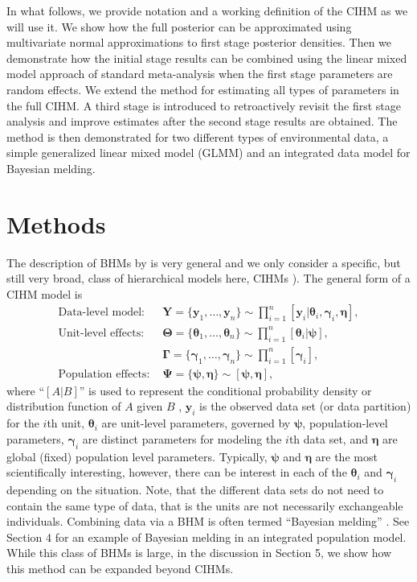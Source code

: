 \documentclass[12pt]{article}
\newcommand{\by}{\mathbf{y}}
\newcommand{\bt}{\boldsymbol{\theta}}
\newcommand{\bn}{\boldsymbol{\eta}}
\newcommand{\bT}{\boldsymbol{\Theta}}
\newcommand{\bp}{\boldsymbol{\psi}}
\newcommand{\bP}{\boldsymbol{\Psi}}
\newcommand{\bg}{\boldsymbol{\gamma}}
\newcommand{\bG}{\boldsymbol{\Gamma}}
\newcommand{\bY}{\mathbf{Y}}
\begin{document}
In what follows, we provide notation and a working definition of the CIHM as we will use it. We show how the full posterior can be approximated using multivariate normal approximations to first stage posterior densities. Then we demonstrate how the initial stage results can be combined using the linear mixed model approach of standard meta-analysis when the first stage parameters are random effects. We extend the method for estimating all types of parameters in the full CIHM. A third stage is introduced to retroactively revisit the first stage analysis and improve estimates after the second stage results are obtained. The method is then demonstrated for two different types of environmental data, a simple generalized linear mixed model (GLMM) and an integrated data model for Bayesian melding. 


\section{Methods}

The description of BHMs by \cite{berliner1996hierarchical} is very general and we only consider a specific, but still very broad, class of hierarchical models here, CIHMs \citep{kass1989approximate,gelfand2015hierarchical}). The general form of a CIHM model is
\begin{equation}\label{eq:full.model}
\begin{aligned}
\text{Data-level model: } & \bY = \{\by_1,\dots,\by_n\} \sim \prod_{i=1}^n[\by_i|\bt_i, \bg_i, \bn], \\
\text{Unit-level effects: } & \bT = \{\bt_1,\dots,\bt_n\} \sim \prod_{i=1}^n[\bt_i|\bp],\\
 & \bG = \{\bg_1,\dots,\bg_n\} \sim \prod_{i=1}^n[\bg_i], \\
\text{Population effects: } & \bP = \{\bp,\bn\} \sim [\bp,\bn],
\end{aligned}
\end{equation}
where ``$[A|B]$'' is used to represent the conditional probability density or distribution function of $A$ given $B$ \citep{gelfand1990sampling}, $\by_i$ is the observed data set (or data partition) for the $i$th unit, $\bt_i$ are unit-level parameters, governed by $\bp$, population-level parameters, $\bg_i$ are distinct parameters for modeling the $i$th data set, and $\bn$ are global (fixed) population level parameters. Typically, $\bp$ and $\bn$ are the most scientifically interesting, however, there can be interest in each of the $\bt_i$ and $\bg_i$ depending on the situation. Note, that the different data sets do not need to contain the same type of data, that is the units are not necessarily exchangeable individuals. Combining data via a BHM is often termed ``Bayesian melding''  \citep{goudie2019joining, liu2014bayesian}. See Section 4 for an example of Bayesian melding in an integrated population model. While this class of BHMs is large, in the discussion in Section 5, we show how this method can be expanded beyond CIHMs.
\end{document}
